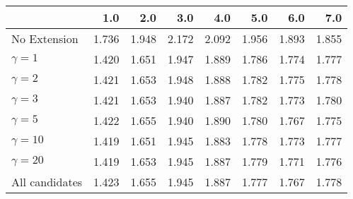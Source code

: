 \begin{tabular}{lrrrrrrr}
\toprule
{} &   1.0 &   2.0 &   3.0 &   4.0 &   5.0 &   6.0 &   7.0 \\
\midrule
No Extension   & 1.736 & 1.948 & 2.172 & 2.092 & 1.956 & 1.893 & 1.855 \\
$\gamma = 1$   & 1.420 & 1.651 & 1.947 & 1.889 & 1.786 & 1.774 & 1.777 \\
$\gamma = 2$   & 1.421 & 1.653 & 1.948 & 1.888 & 1.782 & 1.775 & 1.778 \\
$\gamma = 3$   & 1.421 & 1.653 & 1.940 & 1.887 & 1.782 & 1.773 & 1.780 \\
$\gamma = 5$   & 1.422 & 1.655 & 1.940 & 1.890 & 1.780 & 1.767 & 1.775 \\
$\gamma = 10$  & 1.419 & 1.651 & 1.945 & 1.883 & 1.778 & 1.773 & 1.777 \\
$\gamma = 20$  & 1.419 & 1.653 & 1.945 & 1.887 & 1.779 & 1.771 & 1.776 \\
All candidates & 1.423 & 1.655 & 1.945 & 1.887 & 1.777 & 1.767 & 1.778 \\
\bottomrule
\end{tabular}
